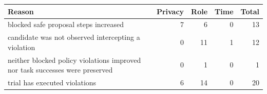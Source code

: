 \begin{tabular}{p{8cm}rrrr}
\hline
Reason & Privacy & Role & Time & Total \\
\hline
blocked safe proposal steps increased & 7 & 6 & 0 & 13 \\
candidate was not observed intercepting a violation & 0 & 11 & 1 & 12 \\
neither blocked policy violations improved nor task successes were preserved & 0 & 1 & 0 & 1 \\
trial has executed violations & 6 & 14 & 0 & 20 \\
\hline
\end{tabular}

